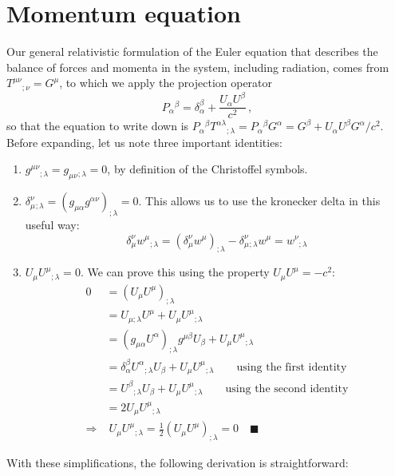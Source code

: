 \documentclass[../main.tex]{subfiles}
\begin{document}
\section*{Momentum equation}
Our general relativistic formulation of the Euler equation that describes the balance of forces and momenta in the system, including radiation, comes from $T^{\mu\nu}{}_{;\nu}=G^\mu$, to which we apply the projection operator
\begin{equation}
    P_\alpha{}^\beta=\delta_\alpha^\beta + \frac{U_\alpha U^\beta}{c^2}\,,
\end{equation}
so that the equation to write down is $P_\alpha{}^\beta T^{\alpha\lambda}{}_{;\lambda}=P_\alpha{}^\beta G^\alpha=G^\beta+U_\alpha U^\beta G^\alpha/c^2$.  Before expanding, let us note three important identities:
\begin{enumerate}
    \item $g^{\mu\nu}{}_{;\lambda}=g_{\mu\nu}{}_{;\lambda}=0$, by definition of the Christoffel symbols.
    
    \item $\delta_\mu^\nu{}_{;\lambda}=(g_{\mu\alpha}g^{\alpha\nu})_{;\lambda}=0$. This allows us to use the kronecker delta in this useful way:
    $$\delta_\mu^\nu w^\mu{}_{;\lambda}=(\delta_\mu^\nu w^\mu)_{;\lambda}-\delta_\mu^\nu{}_{;\lambda}w^\mu=w^\nu{}_{;\lambda}$$
    
    \item $U_\mu U^\mu{}_{;\lambda}=0$. We can prove this using the property $U_\mu U^\mu=-c^2$:
    \begin{align*}
    0&=(U_\mu U^\mu)_{;\lambda}\\
    &=U_{\mu;\lambda}U^\mu+U_\mu U^\mu{}_{;\lambda}\\
    &=(g_{\mu\alpha}U^\alpha)_{;\lambda}g^{\mu\beta}U_{\beta}+U_\mu U^\mu{}_{;\lambda}\\
    &=\delta_\alpha^\beta U^\alpha{}_{;\lambda}U_\beta+U_\mu U^\mu{}_{;\lambda} \qquad\text{using the first identity}\\
    &=U^\beta{}_{;\lambda}U_\beta+U_\mu U^\mu{}_{;\lambda}\qquad\text{using the second identity}\\
    &=2U_\mu U^\mu{}_{;\lambda}\\
    \Rightarrow&\; U_\mu U^\mu{}_{;\lambda}=\frac{1}{2}(U_\mu U^\mu)_{;\lambda}=0 \quad\blacksquare
\end{align*}
\end{enumerate}
With these simplifications, the following derivation is straightforward:
\end{document}
